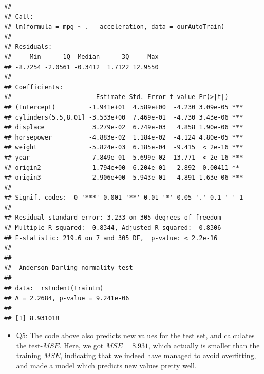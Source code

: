 \documentclass[]{article}
\newenvironment{Shaded}{\begin{snugshade}}{\end{snugshade}}
\newcommand{\KeywordTok}[1]{\textcolor[rgb]{0.13,0.29,0.53}{\textbf{#1}}}
\newcommand{\DataTypeTok}[1]{\textcolor[rgb]{0.13,0.29,0.53}{#1}}
\newcommand{\DecValTok}[1]{\textcolor[rgb]{0.00,0.00,0.81}{#1}}
\newcommand{\OperatorTok}[1]{\textcolor[rgb]{0.81,0.36,0.00}{\textbf{#1}}}
\newcommand{\NormalTok}[1]{#1}
\providecommand{\tightlist}{%
  \setlength{\itemsep}{0pt}\setlength{\parskip}{0pt}}
\begin{document}
\begin{Shaded}
\end{Shaded}

\begin{verbatim}
## 
## Call:
## lm(formula = mpg ~ . - acceleration, data = ourAutoTrain)
## 
## Residuals:
##     Min      1Q  Median      3Q     Max 
## -8.7254 -2.0561 -0.3412  1.7122 12.9550 
## 
## Coefficients:
##                       Estimate Std. Error t value Pr(>|t|)    
## (Intercept)         -1.941e+01  4.589e+00  -4.230 3.09e-05 ***
## cylinders(5.5,8.01] -3.533e+00  7.469e-01  -4.730 3.43e-06 ***
## displace             3.279e-02  6.749e-03   4.858 1.90e-06 ***
## horsepower          -4.883e-02  1.184e-02  -4.124 4.80e-05 ***
## weight              -5.824e-03  6.185e-04  -9.415  < 2e-16 ***
## year                 7.849e-01  5.699e-02  13.771  < 2e-16 ***
## origin2              1.794e+00  6.204e-01   2.892  0.00411 ** 
## origin3              2.906e+00  5.943e-01   4.891 1.63e-06 ***
## ---
## Signif. codes:  0 '***' 0.001 '**' 0.01 '*' 0.05 '.' 0.1 ' ' 1
## 
## Residual standard error: 3.233 on 305 degrees of freedom
## Multiple R-squared:  0.8344, Adjusted R-squared:  0.8306 
## F-statistic: 219.6 on 7 and 305 DF,  p-value: < 2.2e-16
## 
## 
##  Anderson-Darling normality test
## 
## data:  rstudent(trainLm)
## A = 2.2684, p-value = 9.241e-06
## 
## [1] 8.931018
\end{verbatim}

\begin{itemize}
\tightlist
\item
  Q5: The code above also predicts new values for the test set, and
  calculates the test-\(MSE\). Here, we got \(MSE=8.931\), which
  actually is smaller than the training \(MSE\), indicating that we
  indeed have managed to avoid overfitting, and made a model which
  predicts new values pretty well.
\end{itemize}
\end{document}
